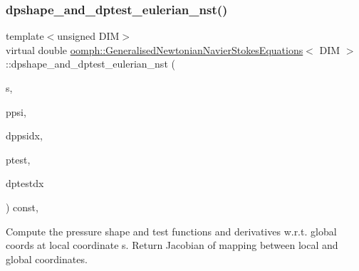 \subsubsection{\texorpdfstring{dpshape\+\_\+and\+\_\+dptest\+\_\+eulerian\+\_\+nst()}{dpshape\_and\_dptest\_eulerian\_nst()}}
{\footnotesize\ttfamily template$<$unsigned D\+IM$>$ \\
virtual double \hyperlink{classoomph_1_1GeneralisedNewtonianNavierStokesEquations}{oomph\+::\+Generalised\+Newtonian\+Navier\+Stokes\+Equations}$<$ D\+IM $>$\+::dpshape\+\_\+and\+\_\+dptest\+\_\+eulerian\+\_\+nst (\begin{DoxyParamCaption}\item[{const \hyperlink{classoomph_1_1Vector}{Vector}$<$ double $>$ \&}]{s,  }\item[{\hyperlink{classoomph_1_1Shape}{Shape} \&}]{ppsi,  }\item[{\hyperlink{classoomph_1_1DShape}{D\+Shape} \&}]{dppsidx,  }\item[{\hyperlink{classoomph_1_1Shape}{Shape} \&}]{ptest,  }\item[{\hyperlink{classoomph_1_1DShape}{D\+Shape} \&}]{dptestdx }\end{DoxyParamCaption}) const\hspace{0.3cm}{\ttfamily [protected]}, {}}



Compute the pressure shape and test functions and derivatives w.\+r.\+t. global coords at local coordinate s. Return Jacobian of mapping between local and global coordinates. 



